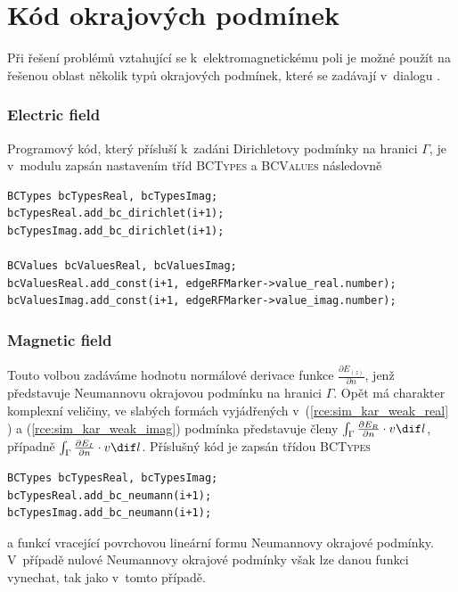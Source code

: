 \section{Kód okrajových podmínek}
Při řešení problémů vztahující se k~elektromagnetickému poli je možné použít na řešenou oblast několik typů okrajových podmínek, které se zadávají v~dialogu . 

\subsubsection*{Electric field}
Programový kód, který přísluší k~zadáni Dirichletovy podmínky na hranici $\Gamma$, je v~modulu zapsán nastavením tříd \textsc{BCTypes} a \textsc{BCValues} následovně
\begin{verbatim}
BCTypes bcTypesReal, bcTypesImag;
bcTypesReal.add_bc_dirichlet(i+1);
bcTypesImag.add_bc_dirichlet(i+1);
                
BCValues bcValuesReal, bcValuesImag;
bcValuesReal.add_const(i+1, edgeRFMarker->value_real.number);
bcValuesImag.add_const(i+1, edgeRFMarker->value_imag.number);
\end{verbatim}

\subsubsection*{Magnetic field}
Touto volbou zadáváme hodnotu normálové derivace funkce $\frac{\partial E_{(z)}}{\partial n}$, jenž představuje Neumannovu okrajovou podmínku na hranici $\Gamma$. Opět má charakter komplexní veličiny, ve slabých formách vyjádřených v~(\ref{rce:sim_kar_weak_real} ) a (\ref{rce:sim_kar_weak_imag}) podmínka představuje členy $\int_{\Gamma}\frac{\partial E_R}{\partial n}\cdot v\dif l$, případně $\int_{\Gamma}\frac{\partial E_I}{\partial n}\cdot v\dif l$. Příslušný kód je zapsán třídou \textsc{BCTypes}
\begin{verbatim}
BCTypes bcTypesReal, bcTypesImag;
bcTypesReal.add_bc_neumann(i+1);
bcTypesImag.add_bc_neumann(i+1);               
\end{verbatim}
a funkcí vracející povrchovou lineární formu Neumannovy okrajové podmínky. V~případě nulové Neumannovy okrajové podmínky však lze danou funkci vynechat, tak jako v~tomto případě.

